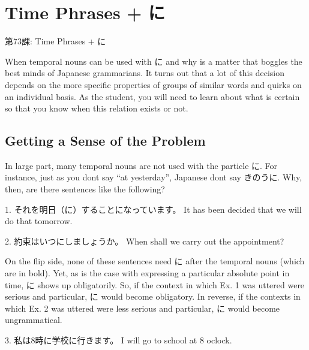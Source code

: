     
\chapter{Time Phrases + に}

\begin{center}
\begin{Large}
第73課: Time Phrases + に 
\end{Large}
\end{center}
 
\par{ When temporal nouns can be used with に and why is a matter that boggles the best minds of Japanese grammarians. It turns out that a lot of this decision depends on the more specific properties of groups of similar words and quirks on an individual basis. As the student, you will need to learn about what is certain so that you know when this relation exists or not. }
      
\section{Getting a Sense of the Problem}
 
\par{ In large part, many temporal nouns are not used with the particle に. For instance, just as you don\textquotesingle t say “at yesterday”, Japanese don\textquotesingle t say きのうに. Why, then, are there sentences like the following? }

\par{1. それを明日（に）することになっています。 \hfill\break
It has been decided that we will do that tomorrow. }

\par{2. 約束はいつにしましょうか。 \hfill\break
When shall we carry out the appointment? }

\par{ On the flip side, none of these sentences need に after the temporal nouns (which are in bold). Yet, as is the case with expressing a particular absolute point in time, に shows up obligatorily. So, if the context in which Ex. 1 was uttered were serious and particular, に would become obligatory. In reverse, if the contexts in which Ex. 2 was uttered were less serious and particular, に would become ungrammatical. }

\par{3. 私は8時に学校に行きます。 \hfill\break
I will go to school at 8 o\textquotesingle  clock. }

